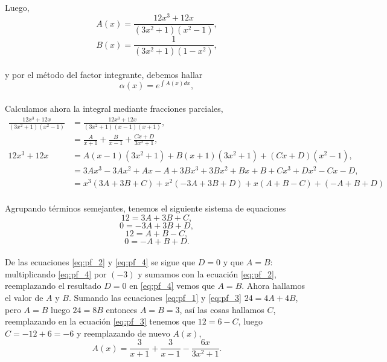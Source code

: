 \documentclass{article}
\begin{document}
\paragraph{}Luego,
$$A(x) = \frac{12x^3 + 12x}{(3x^2+1)(x^2 - 1)},$$
$$B(x) = \frac{1}{(3x^2+1)(1-x^2)},$$
\paragraph{}y por el método del factor integrante, debemos hallar
$$\alpha(x) = e^{\int A(x) dx},$$
\paragraph{} Calculamos ahora la integral mediante fracciones parciales,
\begin{align*}
\frac{12x^3 + 12x}{(3x^2+1)(x^2 - 1)} &= \frac{12x^3 + 12x}{(3x^2+1)(x - 1)(x + 1)},\\
&= \frac{A}{x+1} + \frac{B}{x-1} + \frac{Cx+ D}{3x^2 + 1},\\
12x^3 + 12x &= 	A(x-1)(3x^2 + 1) + B(x+1)(3x^2 + 1) + (Cx + D)(x^2 - 1),\\
&= 3Ax^3 - 3Ax^2 + Ax - A + 3Bx^3 + 3Bx^2 + Bx + B + Cx^3 + Dx^2 - Cx - D,\\
&= x^3(3A + 3B + C) + x^2(-3A + 3B + D) + x(A + B - C) + (-A + B + D)
\end{align*}
\paragraph{}Agrupando términos semejantes, tenemos el siguiente sistema de equaciones
\begin{equation}
12 = 3A + 3B + C,\label{eq:pf_1}
\end{equation}
\begin{equation}
0 = -3A + 3B + D,\label{eq:pf_2}
\end{equation}
\begin{equation}
12 = A + B - C,\label{eq:pf_3}
\end{equation}
\begin{equation}
0 = -A + B + D.\label{eq:pf_4}
\end{equation}
\paragraph{}De las ecuaciones \eqref{eq:pf_2} y \eqref{eq:pf_4} se sigue que $D=0$ y que $A=B$: multiplicando \eqref{eq:pf_4} por $(-3)$ y sumamos con la ecuación \eqref{eq:pf_2}, reemplazando el resultado $D=0$ en \eqref{eq:pf_4} vemos que $A=B$. Ahora hallamos el valor de $A$ y $B$. Sumando las ecuaciones \eqref{eq:pf_1} y \eqref{eq:pf_3} $24 = 4A + 4B$, pero $A=B$ luego $24=8B$ entonces $A=B=3$, así las cosas hallamos $C$, reemplazando en la ecuación \eqref{eq:pf_3} tenemos que $12 = 6 - C$, luego $C= -12 + 6 = -6$ y reemplazando de nuevo $A(x)$,
$$A(x) = \frac{3}{x+1} + \frac{3}{x-1} - \frac{6x}{3x^2 + 1}.$$
\end{document}
